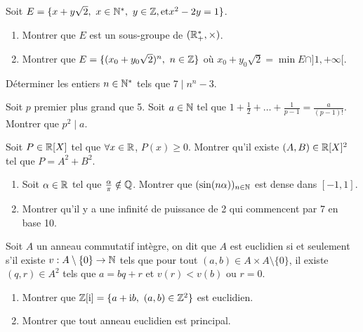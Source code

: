 \begin{exercise}
	Soit $E=\{x+y\sqrt{2},~x\in\mathbb{N}^{*},~y\in\mathbb{Z},\text{et}x^{2}-2y=1\}$.
	\begin{enumerate}
		\item
		Montrer que $E$ est un sous-groupe de $(\mathbb{R}_{+}^{*},\times)$.
		\item
		Montrer que $E=\{(x_{0}+y_{0}\sqrt{2})^{n},~n\in\mathbb{Z}\}$ où
		$x_{0}+y_{0}\sqrt{2}=\min E\cap]1,+\infty[$.
	\end{enumerate}
\end{exercise}

\begin{exercise}
	Déterminer les entiers $n\in\mathbb{N}^{*}$ tels que $7\mid n^{n}-3$.
\end{exercise}

\begin{exercise}
	Soit $p$ premier plus grand que 5. Soit $a\in\mathbb{N}$ tel que
	$1+\frac{1}{2}+\dots+\frac{1}{p-1}=\frac{a}{(p-1)!}$. Montrer que $p^{2}\mid
	a$.
\end{exercise}

\begin{exercise}
	Soit $P\in \mathbb{R}[X]$ tel que $\forall x\in\mathbb{R}$, $P(x)\geqslant0$. Montrer qu'il
	existe $(A,B)\in\mathbb{R}[X]^{2}$ tel que $P=A^{2}+B^{2}$.
\end{exercise}

\begin{exercise}
	\phantom{}
	\begin{enumerate}
		\item
		Soit $\alpha\in\mathbb{R}$ tel que $\frac{\alpha}{\pi}\notin\mathbb{Q}$. Montrer que
		$(\sin(n\alpha))_{n\in\mathbb{N}}$ est dense dans $[-1,1]$.
		\item
		Montrer qu'il y a une infinité de puissance de 2 qui commencent par 7 en
		base 10.
	\end{enumerate}
\end{exercise}

\begin{exercise}
	Soit $A$ un anneau commutatif intègre, on dit que $A$ est euclidien si et
	seulement s'il existe $v:A\setminus\{0\}\to\mathbb{N}$ tels que pour tout $(a,b)\in
	A\times A\setminus\{0\}$, il existe $(q,r)\in A^{2}$ tels que $a=bq+r$ et
	$v(r)<v(b)$ ou $r=0$.
	\begin{enumerate}
		\item
		Montrer que $\mathbb{Z}[\mathrm{i}]=\{a+\mathrm{i}b,~(a,b)\in\mathbb{Z}^{2}\}$ est
		euclidien.
		\item
		Montrer que tout anneau euclidien est principal.
	\end{enumerate}
\end{exercise}

